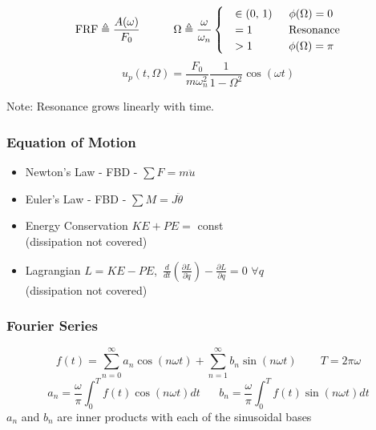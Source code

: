 \documentclass[twocolumn, 12pt]{article}    %
\begin{document}
\[
\text{FRF} \triangleq \frac{A(\omega)}{F_0} \hspace{30pt}
\Omega \triangleq \frac{\omega}{\omega_n} \begin{cases}    
    &\in (0, \,1) \hspace{15pt} \phi(\Omega) = 0\\
    & =1 \hspace{32.5pt} \text{Resonance}\\
    &>1 \hspace{32.55pt} \phi(\Omega) = \pi
\end{cases}
\]
\begin{equation*}
    u_p(t,\Omega) = \frac{F_0}{m\omega_n^2} \frac{1}{1-\Omega^2}\cos(\omega t)
\end{equation*}
\begin{center}
Note: Resonance grows linearly with time.
\end{center}

\subsubsection*{Equation of Motion}
\begin{itemize}
    \item Newton's Law - FBD - \(\sum F = m\ddot{u}\)
    \item Euler's Law - FBD - \(\sum  M = J\ddot{\theta}\)
    \item Energy Conservation \(KE + PE =\) const \\ (dissipation not covered)
    \item Lagrangian \(L=KE-PE\), \,\(\frac{d}{dt}\left( \frac{\partial{L}}{\partial{\Dot{q}}}\right) - \frac{\partial{L}}{\partial{q}} =0\)  \(\forall q\) \\ (dissipation not covered)
\end{itemize}

\subsubsection*{Fourier Series}
\begin{equation*}
    f(t) = \sum_{n=0}^\infty  a_n\cos (n\omega t) + \sum_{n=1}^\infty b_n\sin(n \omega t) \hspace{25pt}T = 2\pi\omega
\end{equation*}
\begin{equation*}
    a_n = \frac{\omega}{\pi}\int_0^T f(t) \cos(n \omega t)dt \hspace{20pt} b_n = \frac{\omega}{\pi}\int_0^T f(t) \sin(n \omega t)dt
\end{equation*}
\(a_n\) and \(b_n\) are inner products with each of the sinusoidal bases
\end{document}
